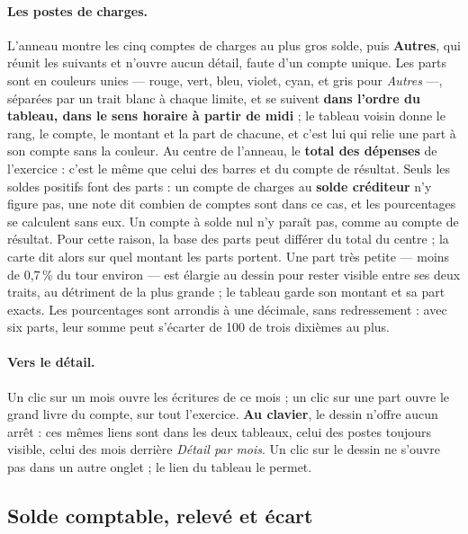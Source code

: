 \documentclass[a4paper,11pt,oneside]{article}
\begin{document}
\paragraph{Les postes de charges.} L'anneau montre les cinq comptes de charges au plus
gros solde, puis \textbf{Autres}, qui réunit les suivants et n'ouvre aucun détail, faute d'un
compte unique. Les parts sont en couleurs unies --- rouge, vert, bleu, violet, cyan, et gris
pour \emph{Autres} ---, séparées par un trait blanc à chaque limite, et se suivent \textbf{dans l'ordre du tableau, dans le sens horaire à
partir de midi} ; le tableau voisin donne le rang, le compte, le montant et la part de
chacune, et c'est lui qui relie une part à son compte sans la couleur. Au centre de l'anneau,
le \textbf{total des dépenses} de l'exercice : c'est le même que celui des barres et du compte
de résultat. Seuls les soldes positifs font des parts : un compte de charges au \textbf{solde
créditeur} n'y figure pas, une note dit combien de comptes sont dans ce cas, et les
pourcentages se calculent sans eux. Un compte à solde nul n'y paraît pas, comme au compte de
résultat. Pour cette raison, la base des parts peut différer du total du centre ; la carte
dit alors sur quel montant les parts portent. Une part très petite --- moins de 0,7\,\% du
tour environ --- est élargie au dessin pour rester visible entre ses deux traits, au
détriment de la plus grande ; le tableau garde son montant et sa part exacts.
Les pourcentages sont arrondis à une décimale, sans redressement : avec six parts, leur somme
peut s'écarter de 100 de trois dixièmes au plus.

\paragraph{Vers le détail.} Un clic sur un mois ouvre les écritures de ce mois ; un clic sur
une part ouvre le grand livre du compte, sur tout l'exercice. \textbf{Au clavier}, le dessin
n'offre aucun arrêt : ces mêmes liens sont dans les deux tableaux, celui des postes toujours
visible, celui des mois derrière \emph{Détail par mois}. Un clic sur le dessin ne s'ouvre pas
dans un autre onglet ; le lien du tableau le permet.

\subsection{Solde comptable, relevé et écart}\label{sec:solde-comptable}
\end{document}
